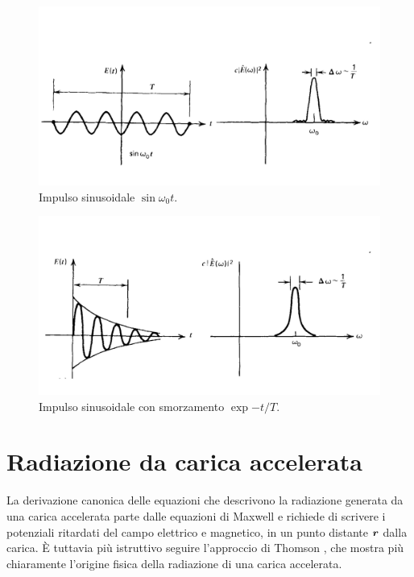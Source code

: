 \begin{figure}
\includegraphics[width=\textwidth]{img/Impulso2}
\caption{Impulso sinusoidale $\sin \omega_0 t$.}\label{fig:Impulso2}
\end{figure}
\begin{figure}
\includegraphics[width=\textwidth]{img/Impulso3}
\caption{Impulso sinusoidale con smorzamento $\exp{-t/T}$.}\label{fig:Impulso3}
\end{figure}

\section{Radiazione da carica accelerata}
La derivazione canonica delle equazioni che descrivono la radiazione generata da una carica accelerata parte dalle equazioni di Maxwell e richiede di scrivere i potenziali ritardati del campo elettrico e magnetico, in un punto distante $\V{r}$ dalla carica. È tuttavia più istruttivo seguire l'approccio di Thomson \citep{book:Longair}, che mostra più chiaramente l'origine fisica della radiazione di una carica accelerata.

